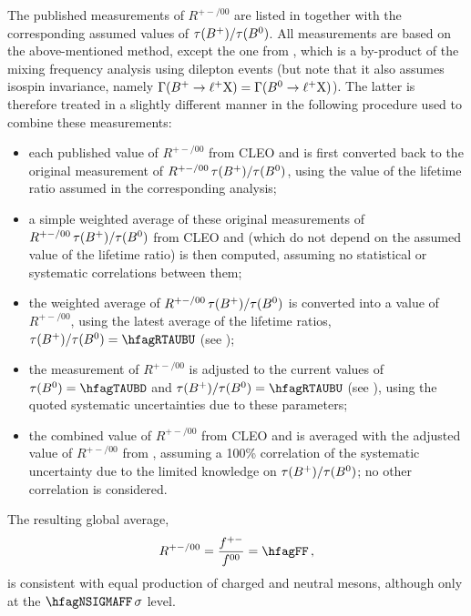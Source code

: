 The published measurements of $R^{+-/00}$ are listed 
in  together with the corresponding assumed values of 
$\tau(B^+)/\tau(B^0)$.
All measurements are based on the above-mentioned method, 
except the one from \belle, which is a by-product of the 
\Bd mixing frequency analysis using dilepton events
(but note that it also assumes isospin invariance, 
namely $\Gamma(B^+ \to \ell^+{\rm X}) = \Gamma(B^0 \to \ell^+{\rm X})$).
The latter is therefore treated in a slightly different 
manner in the following procedure used to combine 
these measurements:
\begin{itemize} 
\item each published value of $R^{+-/00}$ from CLEO and \babar
      is first converted back to the original measurement of 
      $R^{+-/00} \, \tau(B^+)/\tau(B^0)$, using the value of the 
      lifetime ratio assumed in the corresponding analysis;
\item a simple weighted average of these original
      measurements of $R^{+-/00} \, \tau(B^+)/\tau(B^0)$ from 
      CLEO and \babar (which do not depend on the assumed value 
      of the lifetime ratio) is then computed, assuming no 
      statistical or systematic correlations between them;


\item the weighted average of $R^{+-/00} \, \tau(B^+)/\tau(B^0)$ 
      is converted into a value of $R^{+-/00}$, using the latest 
      average of the lifetime ratios, $\tau(\Bu)/\tau(\Bd)=\hfagRTAUBU$ 
      (see );
\item the \belle measurement of $R^{+-/00}$ is adjusted to the 
      current values of $\tau(\Bd)=\hfagTAUBD$ and 
      $\tau(\Bu)/\tau(\Bd)=\hfagRTAUBU$ (see ),
      using the quoted systematic uncertainties due to these parameters;
\item the combined value of $R^{+-/00}$ from CLEO and \babar is averaged 
      with the adjusted value of $R^{+-/00}$ from \belle, assuming a 100\% 
      correlation of the systematic uncertainty due to the limited 
      knowledge on $\tau(B^+)/\tau(B^0)$; no other correlation is considered. 
\end{itemize} 
The resulting global average, 
\begin{equation}
R^{+-/00} = \frac{f^{+-}}{f^{00}} =  \hfagFF \,,
\labe{Rplusminus}
\end{equation}
is consistent with equal production of charged and neutral \B mesons, 
although only at the $\hfagNSIGMAFF\,\sigma$ level.

